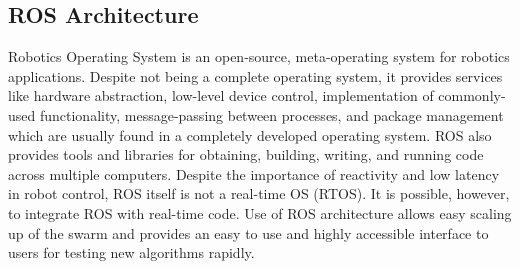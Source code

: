 \begin{spacing}{2}


\section{ROS Architecture}
Robotics Operating System is an open-source, meta-operating system for robotics
applications. Despite not being a complete operating system, it provides services like
hardware abstraction, low-level device control, implementation of commonly-used
functionality, message-passing between processes, and package management which
are usually found in a completely developed operating system. ROS also provides
tools and libraries for obtaining, building, writing, and running code across multiple
computers. Despite the importance of reactivity and low latency in robot control, ROS
itself is not a real-time OS (RTOS). It is possible, however, to integrate ROS with
real-time code.
Use of ROS architecture allows easy scaling up of the swarm and provides an easy
to use and highly accessible interface to users for testing new algorithms rapidly.

\end{spacing}

